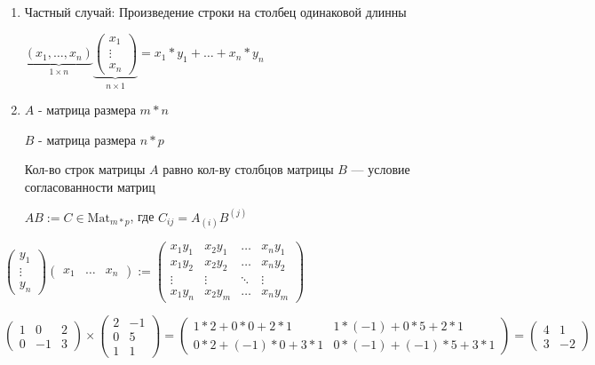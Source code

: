 \begin{enumerate}[label=(\arabic*)]
	\item 
		Частный случай: Произведение строки на столбец одинаковой длинны 
	
		\( \underbrace{(x_1, \dots, x_n)}_{1 \times n} \underbrace{\begin{pmatrix}
			x_1 \\ \vdots \\ x_n
		\end{pmatrix}}_{n \times 1} = x_1 * y_1 + \dots + x_n * y_n \)
		
	\item
		\( A \) - матрица размера \( m * n \)
		
		\( B \) - матрица размера \( n * p \)
		
		Кол-во строк матрицы \( A \) равно кол-ву столбцов матрицы \( B \) --- условие согласованности матриц
		
		\( AB := C \in \text{Mat}_{m*p}\), где \( C_{ij} = A_{(i)} B^{(j)}\)
\end{enumerate}

\begin{example}
	\( \begin{pmatrix}
		y_1 \\ \vdots \\ y_n
	\end{pmatrix} 
	\begin{pmatrix}
		x_1 & \dots & x_n
	\end{pmatrix}
	:= 
	\begin{pmatrix}
		x_1 y_1 & x_2 y_1 & \dots & x_n y_1 \\
		x_1 y_2 & x_2 y_2 & \dots & x_n y_2 \\
		\vdots & \vdots & \ddots & \vdots \\
		x_1 y_n & x_2 y_m & \dots & x_n y_m 
	\end{pmatrix} \)
\end{example}

\begin{example}
	\(
		\begin{pmatrix}
			1 & 0 & 2 \\
			0 & -1 & 3
		\end{pmatrix}
		\times
		\begin{pmatrix}
			2 & -1 \\
			0 & 5 \\
			1 & 1
		\end{pmatrix}
		=
		\begin{pmatrix}
			1 * 2 + 0 * 0 + 2 * 1 & 1 * (-1) + 0 * 5 + 2 * 1 \\
			0 * 2 + (-1) * 0 + 3 * 1 & 0 * (-1) + (-1) * 5 + 3 * 1
		\end{pmatrix}
		=
		\begin{pmatrix}
			4 & 1 \\
			3 & -2
		\end{pmatrix}
	\)
\end{example}